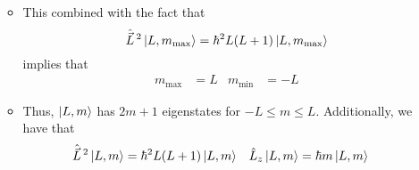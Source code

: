 \documentclass[../notes.tex]{subfiles}
\begin{document}
\begin{itemize}
\begin{itemize}
\begin{equation*}
        \end{equation*}
        \item This combined with the fact that
        \begin{equation*}
            \hat{\vec{L}}{\,}^2\ket{L,m_\text{max}} = \hbar^2L(L+1)\ket{L,m_\text{max}}
        \end{equation*}
        implies that
        \begin{align*}
            m_\text{max} &= L&
            m_\text{min} &= -L
        \end{align*}
        \item Thus, $\ket{L,m}$ has $2m+1$ eigenstates for $-L\leq m\leq L$. Additionally, we have that
        \begin{align*}
            \hat{\vec{L}}{\,}^2\ket{L,m} &= \hbar^2L(L+1)\ket{L,m}&
            \hat{L}_z\ket{L,m} &= \hbar m\ket{L,m}
        \end{align*}
    \end{itemize}
\end{itemize}
\end{document}
